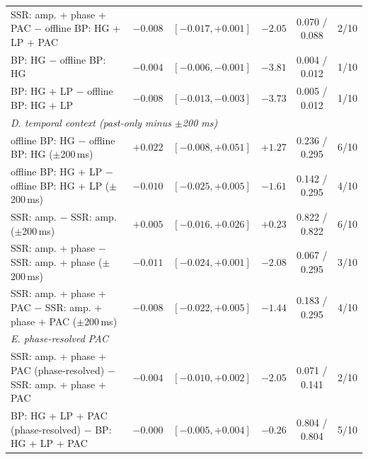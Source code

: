 \begin{tabular}{lccccc}
\quad SSR: amp. + phase + PAC $-$ offline BP: HG + LP + PAC & $-0.008$ & $[-0.017, +0.001]$ & $-2.05$ & 0.070 / 0.088 & 2/10 \\
\quad BP: HG $-$ offline BP: HG & $-0.004$ & $[-0.006, -0.001]$ & $-3.81$ & 0.004 / 0.012 & 1/10 \\
\quad BP: HG + LP $-$ offline BP: HG + LP & $-0.008$ & $[-0.013, -0.003]$ & $-3.73$ & 0.005 / 0.012 & 1/10 \\
\multicolumn{6}{l}{\textit{D. temporal context (past-only minus $\pm$200 ms)}} \\
\quad offline BP: HG $-$ offline BP: HG ($\pm$200\,ms) & $+0.022$ & $[-0.008, +0.051]$ & $+1.27$ & 0.236 / 0.295 & 6/10 \\
\quad offline BP: HG + LP $-$ offline BP: HG + LP ($\pm$200\,ms) & $-0.010$ & $[-0.025, +0.005]$ & $-1.61$ & 0.142 / 0.295 & 4/10 \\
\quad SSR: amp. $-$ SSR: amp. ($\pm$200\,ms) & $+0.005$ & $[-0.016, +0.026]$ & $+0.23$ & 0.822 / 0.822 & 6/10 \\
\quad SSR: amp. + phase $-$ SSR: amp. + phase ($\pm$200\,ms) & $-0.011$ & $[-0.024, +0.001]$ & $-2.08$ & 0.067 / 0.295 & 3/10 \\
\quad SSR: amp. + phase + PAC $-$ SSR: amp. + phase + PAC ($\pm$200\,ms) & $-0.008$ & $[-0.022, +0.005]$ & $-1.44$ & 0.183 / 0.295 & 4/10 \\
\multicolumn{6}{l}{\textit{E. phase-resolved PAC}} \\
\quad SSR: amp. + phase + PAC (phase-resolved) $-$ SSR: amp. + phase + PAC & $-0.004$ & $[-0.010, +0.002]$ & $-2.05$ & 0.071 / 0.141 & 2/10 \\
\quad BP: HG + LP + PAC (phase-resolved) $-$ BP: HG + LP + PAC & $-0.000$ & $[-0.005, +0.004]$ & $-0.26$ & 0.804 / 0.804 & 5/10 \\
\bottomrule
\end{tabular}
